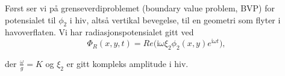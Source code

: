 Først ser vi på grenseverdiproblemet (boundary value problem, BVP) for potensialet til $\phi_2$ i hiv, altså vertikal bevegelse, til en geometri som flyter i havoverflaten. Vi har radiasjonspotensialet gitt ved
\begin{equation}
\Phi_R(x,y,t) = Re\Big( \mathrm{i} \omega \xi_2 \phi_2(x,y) e^{\mathrm{i} \omega t} \Big), 
\end{equation}

der $\frac{\omega}{g} = K$ og $\xi_2$ er gitt kompleks amplitude i hiv.

